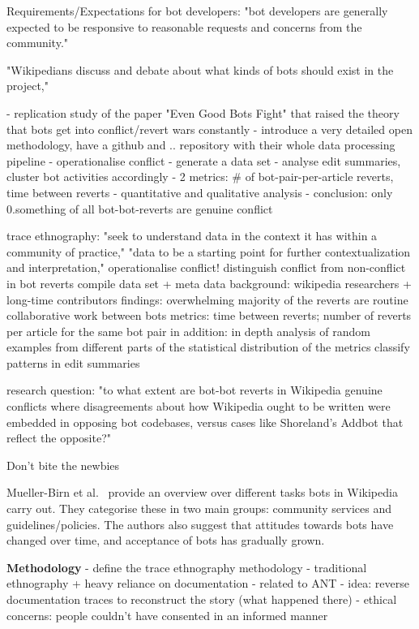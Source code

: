 \documentclass[pdftex,a4paper,11pt]{scrartcl}
\begin{document}
Requirements/Expectations for bot developers:
"bot developers are generally expected to be responsive
to reasonable requests and concerns from the
community."

"Wikipedians discuss and debate
about what kinds of bots should exist in the project,"

\cite{GeiHal2017}
- replication study of the paper "Even Good Bots Fight" that raised the theory
  that bots get into conflict/revert wars constantly
- introduce a very detailed open methodology, have a github and .. repository
  with their whole data processing pipeline
- operationalise conflict
- generate a data set
- analyse edit summaries, cluster bot activities accordingly
- 2 metrics: # of bot-pair-per-article reverts, time between reverts
- quantitative and qualitative analysis
- conclusion: only 0.something of all bot-bot-reverts are genuine conflict

trace ethnography: "seek to understand data in the context it has within a community of practice," "data to be a starting point for further contextualization and interpretation,"
operationalise conflict!
distinguish conflict from non-conflict in bot reverts
compile data set + meta data
background: wikipedia researchers + long-time contributors
findings: overwhelming majority of the reverts are routine collaborative work between bots
metrics: time between reverts; number of reverts per article for the same bot pair
in addition: in depth analysis of random examples from different parts of the statistical distribution of the metrics
classify patterns in edit summaries

research question: "to what extent are bot-bot reverts
in Wikipedia genuine conflicts where disagreements about how Wikipedia ought to be written were
embedded in opposing bot codebases, versus cases like Shoreland’s Addbot that reflect the opposite?"

\cite{HalKitRied2011}
Don't bite the newbies

\cite{MuellerBirn2014}
  Mueller-Birn et al.~\cite{MuellerBirn2014} provide an overview over different tasks bots in Wikipedia carry out.
  They categorise these in two main groups: community services and guidelines/policies.
  The authors also suggest that attitudes towards bots have changed over time, and acceptance of bots has gradually grown.


\textbf{Methodology}
\cite{GeiRib2011}
- define the trace ethnography methodology
- traditional ethnography + heavy reliance on documentation
- related to ANT
- idea: reverse documentation traces to reconstruct the story (what happened
  there)
- ethical concerns: people couldn't have consented in an informed manner
\end{document}
